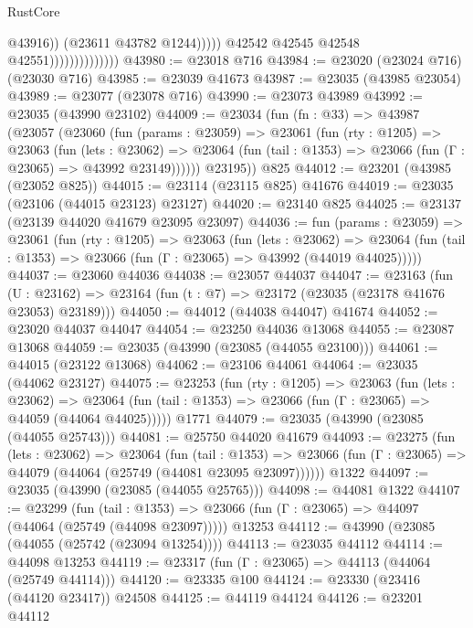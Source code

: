 \begin{lexlean}{RustCore}
\begin{coremodule}
                                            @43916))
                                        (@23611 @43782 @1244)))))
                                @42542
                                @42545
                                @42548
                                @42551))))))))))))))
@43980 := @23018 @716
@43984 := @23020 (@23024 @716) (@23030 @716)
@43985 := @23039 @41673
@43987 := @23035 (@43985 @23054)
@43989 := @23077 (@23078 @716)
@43990 := @23073 @43989
@43992 := @23035 (@43990 @23102)
@44009 := @23034
    (fun (fn : @33) =>
    @43987
      (@23057
        (@23060
          (fun (params : @23059) =>
          @23061
            (fun (rty : @1205) =>
            @23063
              (fun (lets : @23062) =>
              @23064 (fun (tail : @1353) => @23066 (fun (Γ : @23065) => @43992 @23149))))))
        @23195))
    @825
@44012 := @23201 (@43985 (@23052 @825))
@44015 := @23114 (@23115 @825) @41676
@44019 := @23035 (@23106 (@44015 @23123) @23127)
@44020 := @23140 @825
@44025 := @23137 (@23139 @44020 @41679 @23095 @23097)
@44036 := fun (params : @23059) =>
  @23061
    (fun (rty : @1205) =>
    @23063
      (fun (lets : @23062) =>
      @23064 (fun (tail : @1353) => @23066 (fun (Γ : @23065) => @43992 (@44019 @44025)))))
@44037 := @23060 @44036
@44038 := @23057 @44037
@44047 := @23163
    (fun (U : @23162) => @23164 (fun (t : @7) => @23172 (@23035 (@23178 @41676 @23053) @23189)))
@44050 := @44012 (@44038 @44047) @41674
@44052 := @23020 @44037 @44047
@44054 := @23250 @44036 @13068
@44055 := @23087 @13068
@44059 := @23035 (@43990 (@23085 (@44055 @23100)))
@44061 := @44015 (@23122 @13068)
@44062 := @23106 @44061
@44064 := @23035 (@44062 @23127)
@44075 := @23253
    (fun (rty : @1205) =>
    @23063
      (fun (lets : @23062) =>
      @23064 (fun (tail : @1353) => @23066 (fun (Γ : @23065) => @44059 (@44064 @44025)))))
    @1771
@44079 := @23035 (@43990 (@23085 (@44055 @25743)))
@44081 := @25750 @44020 @41679
@44093 := @23275
    (fun (lets : @23062) =>
    @23064
      (fun (tail : @1353) =>
      @23066 (fun (Γ : @23065) => @44079 (@44064 (@25749 (@44081 @23095 @23097))))))
    @1322
@44097 := @23035 (@43990 (@23085 (@44055 @25765)))
@44098 := @44081 @1322
@44107 := @23299
    (fun (tail : @1353) => @23066 (fun (Γ : @23065) => @44097 (@44064 (@25749 (@44098 @23097)))))
    @13253
@44112 := @43990 (@23085 (@44055 (@25742 (@23094 @13254))))
@44113 := @23035 @44112
@44114 := @44098 @13253
@44119 := @23317 (fun (Γ : @23065) => @44113 (@44064 (@25749 @44114)))
@44120 := @23335 @100
@44124 := @23330 (@23416 (@44120 @23417)) @24508
@44125 := @44119 @44124
@44126 := @23201 @44112

\end{coremodule}
\end{lexlean}
